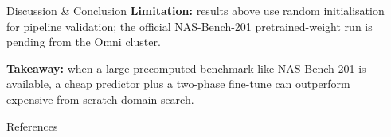 \documentclass[final]{beamer}
\newlength{\sepwidth}
\newlength{\colwidth}
\newcommand{\separatorcolumn}{\begin{column}{\sepwidth}\end{column}}
\begin{document}
\begin{frame}[t]
\begin{columns}[t]
\begin{column}{\colwidth}
\begin{block}{Discussion \& Conclusion}
    \textbf{Limitation:} results above use random initialisation for
    pipeline validation; the official NAS-Bench-201 pretrained-weight run
    is pending from the Omni cluster.

    \textbf{Takeaway:} when a large precomputed benchmark like
    NAS-Bench-201 is available, a cheap predictor plus a two-phase
    fine-tune can outperform expensive from-scratch domain search.
  \end{block}

  \begin{block}{References}
    \nocite{*}
    \footnotesize{}
  \end{block}

\end{column}

\separatorcolumn
\end{columns}
\end{frame}
\end{document}
